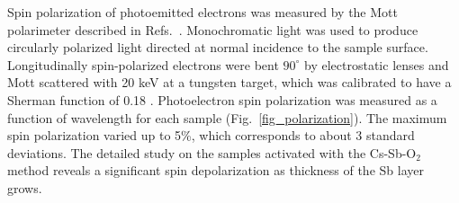Spin polarization of photoemitted electrons was measured by the Mott polarimeter described in Refs.~\cite{Mulhollan_SLAC,bae2018_RuggedSpinpolarizedElectron}.
Monochromatic light was used to produce circularly polarized light directed at normal incidence to the sample surface.
Longitudinally spin-polarized electrons were bent $90^\circ$ by electrostatic lenses and Mott scattered with 20 keV at a tungsten target, which was calibrated to have a Sherman function of 0.18 \cite{Mulhollan_SLAC,bae2018_RuggedSpinpolarizedElectron}. 
Photoelectron spin polarization was measured as a function of wavelength for each sample (Fig.~\ref{fig_polarization}). The maximum spin polarization varied up to 5\%, which corresponds to about 3 standard deviations.
The detailed study \cite{cultrera2020_LongLifetimePolarized} on the samples activated with the Cs-Sb-O$_2$ method reveals a significant spin depolarization as thickness of the Sb layer grows.
 
 
